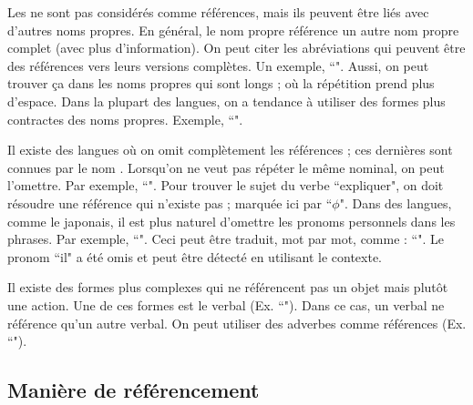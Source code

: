 \documentclass{KodeBook}
\begin{document}
Les  ne sont pas considérés comme références, mais ils peuvent être liés avec d'autres noms propres. 
En général, le nom propre référence un autre nom propre complet (avec plus d'information). 
On peut citer les abréviations qui peuvent être des références vers leurs versions complètes.
Un exemple, ``".
Aussi, on peut trouver ça dans les noms propres qui sont longs ; où la répétition prend plus d'espace. 
Dans la plupart des langues, on a tendance à utiliser des formes plus contractes des noms propres. 
Exemple, ``".

Il existe des langues où on omit complètement les références ; ces dernières sont connues par le nom . 
Lorsqu'on ne veut pas répéter le même  nominal, on peut l'omettre. 
Par exemple, ``".
Pour trouver le sujet du verbe ``expliquer", on doit résoudre une référence qui n'existe pas ; marquée ici par ``$ \phi $".
Dans des langues, comme le japonais, il est plus naturel d'omettre les pronoms personnels dans les phrases. 
Par exemple, ``". 
Ceci peut être traduit, mot par mot, comme : ``".
Le pronom ``il" a été omis et peut être détecté en utilisant le contexte.

Il existe des formes plus complexes qui ne référencent pas un objet mais plutôt une action.
Une de ces formes est le  verbal (Ex. ``").
Dans ce cas, un  verbal ne référence qu'un autre  verbal. 
On peut utiliser des adverbes comme références (Ex. ``").


\subsection{Manière de référencement}
\end{document}
